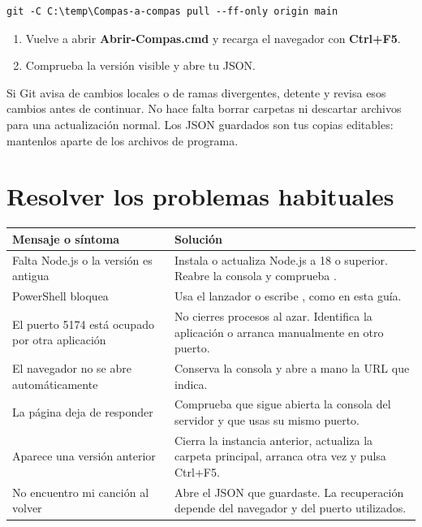 \documentclass[a4paper,11pt]{article}
\newcounter{none}
\let\originaltexttt\texttt
\renewcommand{\texttt}[1]{\originaltexttt{\seqsplit{#1}}}
\providecommand{\tightlist}{\setlength{\itemsep}{2pt}\setlength{\parskip}{0pt}}
\begin{document}
\begin{verbatim}
git -C C:\temp\Compas-a-compas pull --ff-only origin main
\end{verbatim}

\begin{enumerate}
\def\labelenumi{\arabic{enumi}.}
\setcounter{enumi}{3}
\tightlist
\item
  Vuelve a abrir \textbf{Abrir-Compas.cmd} y recarga el navegador con
  \textbf{Ctrl+F5}.
\item
  Comprueba la versión visible y abre tu JSON.
\end{enumerate}

Si Git avisa de cambios locales o de ramas divergentes, detente y revisa
esos cambios antes de continuar. No hace falta borrar carpetas ni
descartar archivos para una actualización normal. Los JSON guardados son
tus copias editables: mantenlos aparte de los archivos de programa.

\Needspace{3.5cm}
\section{Resolver los problemas
habituales}\label{resolver-los-problemas-habituales}

{\def\LTcaptype{none} %
\begin{longtable}[]{@{}>{\raggedright\arraybackslash}p{}>{\raggedright\arraybackslash}p{}@{}}
\toprule\noalign{}
Mensaje o síntoma & Solución \\
\midrule\noalign{}
\endhead
\bottomrule\noalign{}
\endlastfoot
Falta Node.js o la versión es antigua & Instala o actualiza Node.js a 18
o superior. Reabre la consola y comprueba \texttt{node\ -\/-version}. \\
PowerShell bloquea \texttt{npm.ps1} & Usa el lanzador o escribe
\texttt{npm.cmd\ start}, como en esta guía. \\
El puerto 5174 está ocupado por otra aplicación & No cierres procesos al
azar. Identifica la aplicación o arranca manualmente en otro puerto. \\
El navegador no se abre automáticamente & Conserva la consola y abre a
mano la URL que indica. \\
La página deja de responder & Comprueba que sigue abierta la consola del
servidor y que usas su mismo puerto. \\
Aparece una versión anterior & Cierra la instancia anterior, actualiza
la carpeta principal, arranca otra vez y pulsa Ctrl+F5. \\
No encuentro mi canción al volver & Abre el JSON que guardaste. La
recuperación depende del navegador y del puerto utilizados. \\
\end{longtable}
}
\end{document}
